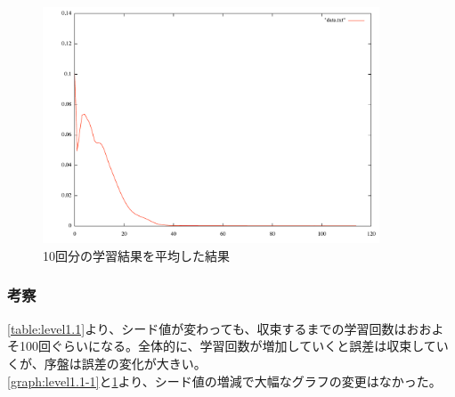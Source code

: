 \begin{figure}[h]
 \begin{center}
  \includegraphics[width=10.0cm]{level1/ex_ave.pdf}
  \caption{10回分の学習結果を平均した結果}
  \label{graph:level1.1-2}
 \end{center}
\end{figure}

\subsubsection{考察}
\ref{table:level1.1}より、シード値が変わっても、収束するまでの学習回数はおおよそ100回ぐらいになる。全体的に、学習回数が増加していくと誤差は収束していくが、序盤は誤差の変化が大きい。\\
\ref{graph:level1.1-1}と\ref{graph:level1.1-2}より、シード値の増減で大幅なグラフの変更はなかった。

